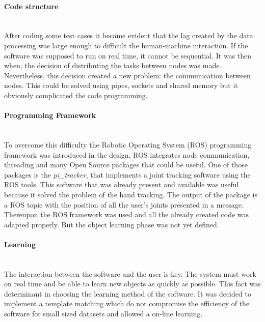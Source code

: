 \paragraph{Code structure}
\mbox{} \\

After coding some test cases it became evident that the lag created by the data processing was large enough to difficult the human-machine interaction. 
If the software was supposed to run on real time, it cannot be sequential. 
It was then when, the decision of distributing the tasks between nodes was made. 
Nevertheless, this decision created a new problem: the communication between nodes. 
This could be solved using pipes, sockets and shared memory but it obviously complicated the code programming. 
\\


\paragraph{Programming Framework}
\mbox{} \\

To overcome this difficulty the Robotic Operating System (ROS) programming framework was introduced in the design.
ROS integrates node communication, threading and many Open Source packages that could be useful. 
One of those packages is the \textit{pi\_tracker}, that implements a joint tracking software using the ROS tools. 
This software that was already present and available was useful because it solved the problem of the hand tracking. 
The output of the package is a ROS topic with the position of all the user's joints presented in a message. 
Thereupon the ROS framework was used and all the already created code was adapted properly. 
But the object learning phase was not yet defined. 
\\


\paragraph{Learning}
\mbox{} \\

The interaction between the software and the user is key. 
The system must work on real time and be able to learn new objects as quickly as possible. 
This fact was determinant in choosing the learning method of the software. 
It was decided to implement a template matching which do not compromise the efficiency of the software for small sized datasets and allowed a on-line learning. 
\\

